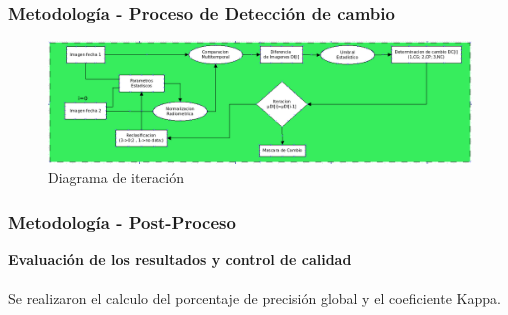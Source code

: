 \documentclass[xcolor=table]{beamer}
\begin{document}
\begin{frame}
	\frametitle{Metodolog\'ia - Proceso de Detecci\'on de cambio}
\begin{figure}
\centering
\includegraphics[width=0.8\linewidth, height=0.5\textheight]{imagenes/iteracion}
\caption{Diagrama de iteraci\'on}
\label{fig:iteracion}
\end{figure}


\end{frame}
\begin{frame}
	\frametitle{Metodolog\'ia - Post-Proceso}
	\textbf{Evaluaci\'on de los resultados y control de calidad}\\~\\	
Se realizaron el calculo del porcentaje de precisi\'on global y el coeficiente Kappa.
	
\end{frame}
\end{document}

